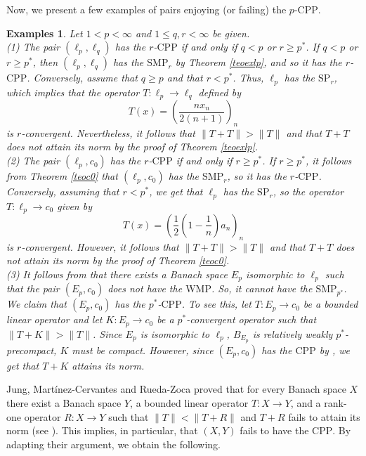 \documentclass[12 pt]{article}%
\newtheorem{examples}[theorem]{Examples}
\newtheorem{final remark}[theorem]{Final Remark}
\newcommand{\norma}[1]{\| #1 \|}
\begin{document}
Now, we present a few examples of pairs enjoying (or failing) the $p$-$\mathrm{CPP}$.

\begin{examples} \label{pcpp2}\rm  Let $1 < p < \infty$ and $1 \leq q, r < \infty$ be given. \\ (1) {\it  The pair $(\ell_p, \ell_q)$ has the $r$-$\mathrm{CPP}$ if and only if $q < p$ or $r \geq p^*$}. If $q < p$ or $r \geq p^*$, then $(\ell_p, \ell_q)$ has the $\mathrm{SMP}_r$ by Theorem \ref{teoexlp}, and so it has the $r$-$\mathrm{CPP}$.
Conversely, assume that $q \geq p$ and that $r < p^*$. Thus, $\ell_p$ has the $\mathrm{SP}_r$, which implies that the operator $T: \ell_p \to \ell_q$ defined by    $$T(x)=\left(\frac{n x_{n}}{2(n+1)}\right)_{n}$$    is $r$-convergent. Nevertheless, it follows that $\norma{T + T} > \norma{T}$ and that $T+ T$ does not attain its norm by the proof of Theorem \ref{teoexlp}. \\
(2) The pair $(\ell_p, c_0)$ has the $r$-$\mathrm{CPP}$ if and only if $r \geq p^*$.  If $r \geq p^*$, it follows from Theorem \ref{teoc0} that $(\ell_p, c_0)$ has the $\mathrm{SMP}_r$, so it has the $r$-$\mathrm{CPP}$. Conversely, assuming that $r < p^*$, we get that $\ell_p$ has the $\mathrm{SP}_r$, so the operator $T: \ell_p \to c_0$ given by 
$$ T(x)=\left(\frac12\left(1-\frac1n\right)a_n\right)_n $$ is $r$-convergent. However, it follows that $\norma{T + T} > \norma{T}$ and that $T+T$ does not attain its norm by the proof of Theorem \ref{teoc0}. \\
{\rm (3)} It follows from \cite[Proposition 3.6]{dantasjung} that there exists a Banach space $E_p$ isomorphic to $\ell_p$ such that the pair $(E_p, c_0)$ does not have the $\mathrm{WMP}$. So, it cannot have the $\mathrm{SMP}_{p^*}$. We claim that $(E_p, c_0)$ has the $p^*$-$\mathrm{CPP}$.
To see this, let $T: E_p \to c_0$ be a bounded linear operator and let $K: E_p \to c_0$ be a $p^*$-convergent operator such that $\norma{T+K} > \norma{T}$. Since $E_p$ is isomorphic to $\ell_p$, $B_{E_p}$ is relatively weakly $p^*$-precompact, $K$ must be compact. However, since $(E_p, c_0)$ has the $\mathrm{CPP}$ by \cite[Proposition 3.6]{dantasjung}, we get that $T+K$ attains its norm. 
\end{examples}




Jung, Martínez-Cervantes and Rueda-Zoca proved that for every Banach space $X$ there exist a Banach space $Y$, a bounded linear operator $T: X \to Y$, and a rank-one operator $R: X\to Y$ such that $\norma{T} < \norma{T+R}$ and $T+R$ fails to attain its norm (see \cite[Theorem 2.1]{jung}). This implies, in particular, that $(X, Y)$ fails to have the $\mathrm{CPP}$. By adapting their argument, we obtain the following.
\end{document}
